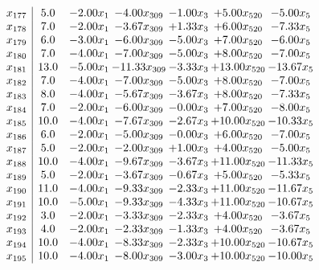 \documentclass[8pt]{article}
\begin{document}
\[\begin{array}{c| c c@{\hskip 2pt} c@{\hskip 2pt} c@{\hskip 2pt} c@{\hskip 2pt} c@{\hskip 2pt} }
 x_{177}   &  5.0 & -2.00 x_{1} & -4.00 x_{309} & -1.00 x_{3} & +  5.00 x_{520} & -5.00 x_{5}\\
 x_{178}   &  7.0 & -2.00 x_{1} & -3.67 x_{309} & +  1.33 x_{3} & +  6.00 x_{520} & -7.33 x_{5}\\
 x_{179}   &  6.0 & -3.00 x_{1} & -6.00 x_{309} & -5.00 x_{3} & +  7.00 x_{520} & -6.00 x_{5}\\
 x_{180}   &  7.0 & -4.00 x_{1} & -7.00 x_{309} & -5.00 x_{3} & +  8.00 x_{520} & -7.00 x_{5}\\
 x_{181}   &  13.0 & -5.00 x_{1} & -11.33 x_{309} & -3.33 x_{3} & + 13.00 x_{520} & -13.67 x_{5}\\
 x_{182}   &  7.0 & -4.00 x_{1} & -7.00 x_{309} & -5.00 x_{3} & +  8.00 x_{520} & -7.00 x_{5}\\
 x_{183}   &  8.0 & -4.00 x_{1} & -5.67 x_{309} & -3.67 x_{3} & +  8.00 x_{520} & -7.33 x_{5}\\
 x_{184}   &  7.0 & -2.00 x_{1} & -6.00 x_{309} & -0.00 x_{3} & +  7.00 x_{520} & -8.00 x_{5}\\
 x_{185}   &  10.0 & -4.00 x_{1} & -7.67 x_{309} & -2.67 x_{3} & + 10.00 x_{520} & -10.33 x_{5}\\
 x_{186}   &  6.0 & -2.00 x_{1} & -5.00 x_{309} & -0.00 x_{3} & +  6.00 x_{520} & -7.00 x_{5}\\
 x_{187}   &  5.0 & -2.00 x_{1} & -2.00 x_{309} & +  1.00 x_{3} & +  4.00 x_{520} & -5.00 x_{5}\\
 x_{188}   &  10.0 & -4.00 x_{1} & -9.67 x_{309} & -3.67 x_{3} & + 11.00 x_{520} & -11.33 x_{5}\\
 x_{189}   &  5.0 & -2.00 x_{1} & -3.67 x_{309} & -0.67 x_{3} & +  5.00 x_{520} & -5.33 x_{5}\\
 x_{190}   &  11.0 & -4.00 x_{1} & -9.33 x_{309} & -2.33 x_{3} & + 11.00 x_{520} & -11.67 x_{5}\\
 x_{191}   &  10.0 & -5.00 x_{1} & -9.33 x_{309} & -4.33 x_{3} & + 11.00 x_{520} & -10.67 x_{5}\\
 x_{192}   &  3.0 & -2.00 x_{1} & -3.33 x_{309} & -2.33 x_{3} & +  4.00 x_{520} & -3.67 x_{5}\\
 x_{193}   &  4.0 & -2.00 x_{1} & -2.33 x_{309} & -1.33 x_{3} & +  4.00 x_{520} & -3.67 x_{5}\\
 x_{194}   &  10.0 & -4.00 x_{1} & -8.33 x_{309} & -2.33 x_{3} & + 10.00 x_{520} & -10.67 x_{5}\\
 x_{195}   &  10.0 & -4.00 x_{1} & -8.00 x_{309} & -3.00 x_{3} & + 10.00 x_{520} & -10.00 x_{5}\\

\end{array}\]
\end{document}
